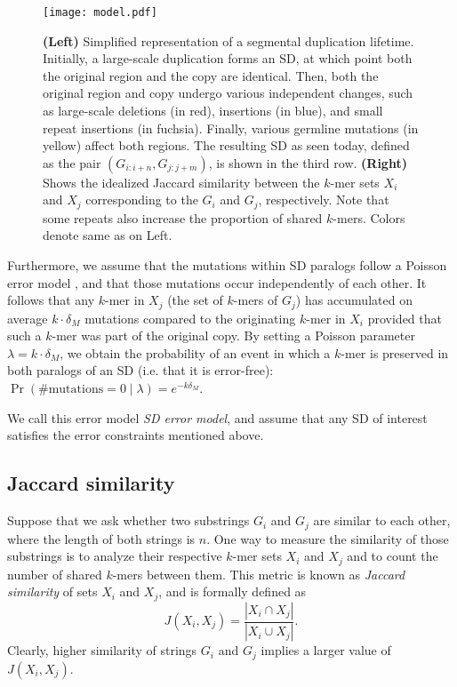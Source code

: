 \documentclass{article}
\begin{document}
\begin{figure*}
\centering
\texttt{[image: model.pdf]}
\caption{{\bf (Left)\/} Simplified representation of a segmental duplication lifetime. Initially, a large-scale duplication forms an SD, at which point both the original region and the copy are identical. Then, both the original region and copy undergo various independent changes, such as large-scale deletions (in red), insertions (in blue), and small repeat insertions (in fuchsia). Finally, various germline mutations (in yellow) affect both regions. The resulting SD as seen today, defined as the pair $(G_{i:i+n},G_{j:j+m})$, is shown in the third row. {\bf (Right)\/} Shows the idealized Jaccard similarity between the $k$-mer sets $X_i$ and $X_j$ corresponding to the $G_i$ and $G_j$, respectively. Note that some repeats also increase the proportion of shared $k$-mers. Colors denote same as on Left.}
\label{fig:model}
\end{figure*}


Furthermore, we assume that the mutations within SD paralogs follow a Poisson error model \citep{Jain2017a, Fan2015}, and that those mutations occur independently of each other. It follows that any $k$-mer in $X_j$ (the set of $k$-mers of $G_j$) has accumulated on average $k\cdot\delta_M$ mutations compared to the originating $k$-mer in $X_i$ provided that such a $k$-mer was part of the original copy. By setting a Poisson parameter $\lambda=k\cdot \delta_M $, we obtain the probability of an event in which a $k$-mer is preserved in both paralogs of an SD (i.e. that it is error-free): $\Pr(\text{\# mutations} = 0\mid\lambda)=e^{-k \delta_M}$. 

We call this error model \emph{SD error model}, and assume that any SD of interest satisfies the error constraints mentioned above.

\subsection{Jaccard similarity}
\label{sec:jaccard}

Suppose that we ask whether two substrings $G_i$ and $G_j$ are similar to each other, where the length of both strings is $n$. One way to measure the similarity of those substrings is to analyze their respective $k$-mer sets $X_i$ and $X_j$ and to count the number of shared $k$-mers between them. This metric is known as \emph{Jaccard similarity} of sets $X_i$ and $X_j$, and is formally defined as 
$$J(X_i,X_j)=\frac{|X_i\cap X_j|}{|X_i\cup X_j|}.$$ 
Clearly, higher similarity of strings $G_i$ and $G_j$ implies a larger value of $J(X_i,X_j)$. 
\end{document}
